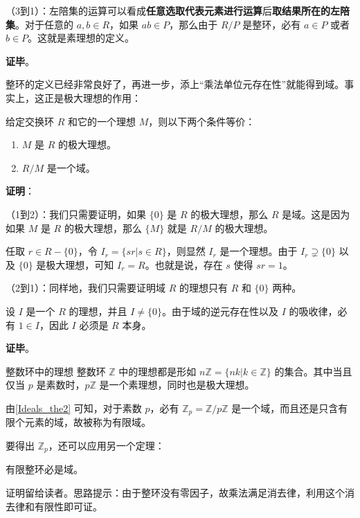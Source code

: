 （3到1）：左陪集的运算可以看成\textbf{任意选取代表元素进行运算}后\textbf{取结果所在的左陪集}。对于任意的 $a, b\in R$，如果 $ab\in P$，那么由于 $R/P$ 是整环，必有 $a\in P$ 或者 $b\in P$。这就是素理想的定义。

\textbf{证毕}。

整环的定义已经非常良好了，再进一步，添上“乘法单位元存在性”就能得到域。事实上，这正是极大理想的作用：

\begin{theorem}{}\label{Ideals_the2}
给定交换环 $R$ 和它的一个理想 $M$，则以下两个条件等价：
\begin{enumerate}
\item $M$ 是 $R$ 的极大理想。
\item $R/M$ 是一个域。
\end{enumerate}
\end{theorem}

\textbf{证明}：




（1到2）：我们只需要证明，如果 $\{0\}$ 是 $R$ 的极大理想，那么 $R$ 是域。这是因为如果 $M$ 是 $R$ 的极大理想，那么 $\{M\}$ 就是 $R/M$ 的极大理想。

任取 $r\in R-\{0\}$，令 $I_r=\{sr|s\in R\}$，则显然 $I_r$ 是一个理想。由于 $I_r\supsetneq \{0\}$ 以及 $\{0\}$ 是极大理想，可知 $I_r=R$。也就是说，存在 $s$ 使得 $sr=1$。

（2到1）：同样地，我们只需要证明域 $R$ 的理想只有 $R$ 和 $\{0\}$ 两种。

设 $I$ 是一个 $R$ 的理想，并且 $I\not=\{0\}$。由于域的逆元存在性以及 $I$ 的吸收律，必有 $1\in I$，因此 $I$ 必须是 $R$ 本身。


\textbf{证毕}。


\begin{example}{整数环中的理想}
整数环 $\mathbb{Z}$ 中的理想都是形如 $n\mathbb{Z}=\{nk|k\in\mathbb{Z}\}$ 的集合。其中当且仅当 $p$ 是素数时，$p\mathbb{Z}$ 是一个素理想，同时也是极大理想。

由\autoref{Ideals_the2} 可知，对于素数 $p$，必有 $\mathbb{Z}_p=\mathbb{Z}/p\mathbb{Z}$ 是一个域，而且还是只含有限个元素的域，故被称为有限域。
\end{example}

要得出 $\mathbb{Z}_p$，还可以应用另一个定理：

\begin{theorem}{}
有限整环必是域。
\end{theorem}

证明留给读者。思路提示：由于整环没有零因子，故乘法满足消去律，利用这个消去律和有限性即可证。



